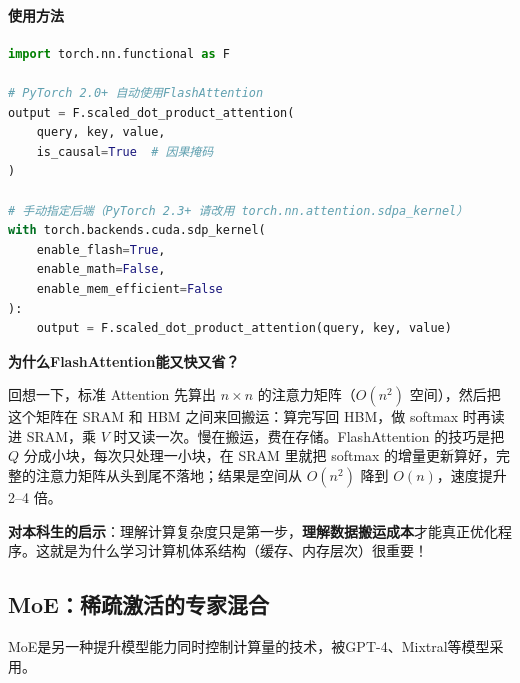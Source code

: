 \paragraph{使用方法}\mbox{}\par\nopagebreak

\begin{lstlisting}[language=Python, caption=PyTorch 2.0+ 内置FlashAttention]
import torch.nn.functional as F

# PyTorch 2.0+ 自动使用FlashAttention
output = F.scaled_dot_product_attention(
    query, key, value,
    is_causal=True  # 因果掩码
)

# 手动指定后端（PyTorch 2.3+ 请改用 torch.nn.attention.sdpa_kernel）
with torch.backends.cuda.sdp_kernel(
    enable_flash=True,
    enable_math=False,
    enable_mem_efficient=False
):
    output = F.scaled_dot_product_attention(query, key, value)
\end{lstlisting}

\begin{physicalmeaning}
\textbf{为什么FlashAttention能又快又省？}

回想一下，标准 Attention 先算出 $n \times n$ 的注意力矩阵（$O(n^2)$ 空间），然后把这个矩阵在 SRAM 和 HBM 之间来回搬运：算完写回 HBM，做 softmax 时再读进 SRAM，乘 $V$ 时又读一次。慢在搬运，费在存储。FlashAttention 的技巧是把 $Q$ 分成小块，每次只处理一小块，在 SRAM 里就把 softmax 的增量更新算好，完整的注意力矩阵从头到尾不落地；结果是空间从 $O(n^2)$ 降到 $O(n)$，速度提升 2--4 倍。

\textbf{对本科生的启示}：理解计算复杂度只是第一步，\textbf{理解数据搬运成本}才能真正优化程序。这就是为什么学习计算机体系结构（缓存、内存层次）很重要！
\end{physicalmeaning}

\subsection*{MoE：稀疏激活的专家混合}


MoE是另一种提升模型能力同时控制计算量的技术，被GPT-4、Mixtral等模型采用。

